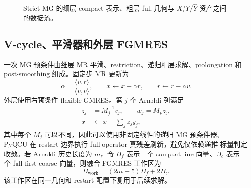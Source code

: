 \documentclass[UTF8,a4paper,11pt,fontset=none]{ctexart}
\numberwithin{equation}{section}
\numberwithin{figure}{section}
\numberwithin{table}{section}
\begin{document}
\begin{figure}[htbp]
\centering
{}
\caption{Strict MG 的细层 compact 表示、粗层 full 几何与 \(X/Y/\widehat Y\)
资产之间的数据流。}
\label{fig:strict-flow}
\end{figure}

\subsection{V-cycle、平滑器和外层 FGMRES}

一次 MG 预条件由细层 MR 平滑、restriction、递归粗层求解、prolongation
和 post-smoothing 组成。固定步 MR 更新为
\begin{equation}
 \alpha=\frac{\langle v,r\rangle}{\langle v,v\rangle},
\qquad
 x\leftarrow x+\alpha r,
\qquad
 r\leftarrow r-\alpha v.
\label{eq:mr}
\end{equation}
外层使用右预条件 flexible GMRES。第 \(j\) 个 Arnoldi 列满足
\begin{align}
 z_j&=M_j^{-1}v_j,\qquad w_j=M_pz_j,
\label{eq:fgmres-preconditioner}\\
 x&\leftarrow x+\sum_jz_jy_j,
\label{eq:fgmres-update}
\end{align}
其中每个 \(M_j\) 可以不同，因此可以使用非固定线性的递归 MG 预条件器。
PyQCU 在 restart 边界执行 full-operator 真残差刷新，避免仅依赖递推
标量判定收敛。若 Arnoldi 历史长度为 \(m\)，令 \(B_f\) 表示一个
compact fine 向量、\(B_c\) 表示一个 full first-coarse 向量，则融合
FGMRES 工作区为
\begin{equation}
 B_{\mathrm{work}}=(2m+5)B_f+2B_c.
\label{eq:fgmres-workspace}
\end{equation}
该工作区在同一几何和 restart 配置下复用于后续求解。
\end{document}
